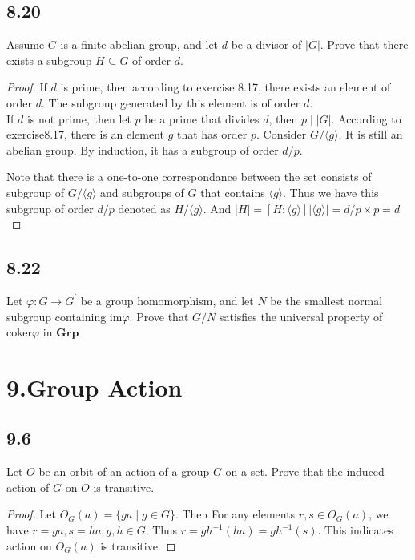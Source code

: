 \documentclass[a4paper, pdf, 12pt]{article}
\begin{document}
\subsection*{8.20}
Assume $G$ is a finite abelian group, and let $d$ be a divisor of $\lvert G\rvert$. Prove
that there exists a subgroup $H \subseteq G$ of order $d$.
\begin{proof}
  If $d$ is prime, then according to exercise 8.17, there exists an element of order $d$. The subgroup 
  generated by this element is of order $d$. \\
  If $d$ is not prime, then let $p$ be a prime that divides $d$, then $p\mid \lvert G\rvert$. According to exercise8.17, 
  there is an element $g$ that has order $p$. Consider $G/\langle g\rangle$. It is still an abelian group. By induction, it 
  has a subgroup of order $d/p$. 

  Note that there is a one-to-one correspondance between the set consists of subgroup of $G/\langle g\rangle$ and 
  subgroups of $G$ that contains $\langle g \rangle$. Thus we have this subgroup of order $d/p$ denoted as 
  $H/\langle g\rangle$. And $\lvert H\rvert = [H:\langle g\rangle]\lvert\langle g\rangle\rvert = d/p\times p = d$
\end{proof}

\subsection*{8.22}
Let $\varphi: G \rightarrow G^{'}$ be a group homomorphism, and let $N$ be the smallest
normal subgroup containing im$\varphi$. Prove that 
$G/N$ satisfies the universal property
of coker$\varphi$ in $\mathbf{Grp}$

\section{9.Group Action}
\subsection*{9.6}
Let $O$ be an orbit of an action of a group $G$ on a set. Prove that the induced
action of $G$ on $O$ is transitive.

\begin{proof}
  Let $O_{G}(a) = \{ga\mid g\in G\}$. Then For any elements $r,s\in O_{G}(a)$, we have $r = ga, s = ha, g,h\in G$.
  Thus $r = gh^{-1}(ha) = gh^{-1}(s)$. This indicates action on $O_{G}(a)$ is transitive.
\end{proof}
\end{document}
